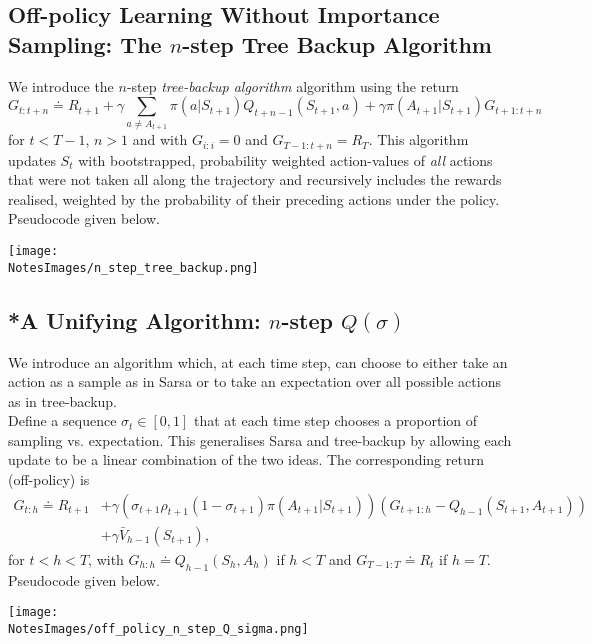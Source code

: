 \subsection{Off-policy Learning Without Importance Sampling: The $n$-step Tree Backup Algorithm}
We introduce the $n$-step \emph{tree-backup algorithm} algorithm using the return
\begin{equation}
    G_{t:t+n} \doteq R_{t+1} + \gamma \sum_{a \neq A_{t+1}} \pi(a|S_{t+1})Q_{t+n-1}(S_{t+1}, a) + \gamma \pi(A_{t+1}|S_{t+1})G_{t+1:t+n}
\end{equation}
for $t < T-1$, $n > 1$ and with $G_{i:i} = 0$ and $G_{T-1:t+n} = R_T$. This algorithm updates $S_t$ with bootstrapped, probability weighted action-values of \emph{all} actions that were not taken all along the trajectory and recursively includes the rewards realised, weighted by the probability of their preceding actions under the policy. Pseudocode given below.

\texttt{[image: \\NotesImages/n\_step\_tree\_backup.png]}
    
    
\subsection{*A Unifying Algorithm: $n$-step $Q(\sigma)$}
We introduce an algorithm which, at each time step, can choose to either take an action as a sample as in Sarsa or to take an expectation over all possible actions as in tree-backup. \\

Define a sequence $\sigma_t \in [0, 1]$ that at each time step chooses a proportion of sampling vs. expectation. This generalises Sarsa and tree-backup by allowing each update to be a linear combination of the two ideas. The corresponding return (off-policy) is 
\begin{align}
    G_{t:h} \doteq R_{t+1} &+ \gamma \left(\sigma_{t+1}\rho_{t+1}  (1- \sigma_{t+1})\pi(A_{t+1}\vert S_{t+1})\right) \left( G_{t+1:h} - Q_{h-1}(S_{t+1}, A_{t+1}) \right) \\ 
                           &+ \gamma \bar{V}_{h-1}(S_{t+1}),
\end{align}
for $t < h< T$, with $G_{h:h} \doteq Q_{h-1}(S_h, A_h)$ if $h<T$ and $G_{T-1:T} \doteq R_t$ if $h=T$. Pseudocode given below.

\texttt{[image: \\NotesImages/off\_policy\_n\_step\_Q\_sigma.png]}
    
    
    
    
    
    
    
    
    
    
    

